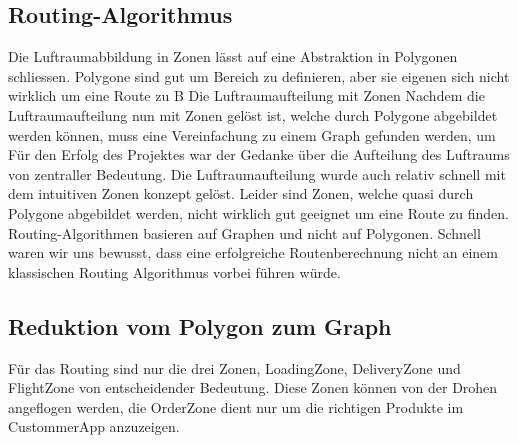 \subsection{Routing-Algorithmus}


Die Luftraumabbildung in Zonen lässt auf eine Abstraktion in Polygonen schliessen. Polygone sind gut um Bereich zu definieren, aber sie eigenen sich nicht wirklich um eine Route zu B
Die Luftraumaufteilung mit Zonen
Nachdem die Luftraumaufteilung nun mit Zonen gelöst ist, welche durch Polygone abgebildet werden können, muss eine Vereinfachung zu einem Graph gefunden werden, um
Für den Erfolg des Projektes war der Gedanke über die Aufteilung des Luftraums von zentraller Bedeutung. Die Luftraumaufteilung wurde auch relativ schnell mit dem intuitiven Zonen konzept gelöst. Leider sind Zonen, welche quasi durch Polygone abgebildet werden, nicht wirklich gut geeignet um eine Route zu finden. Routing-Algorithmen basieren auf Graphen und nicht auf Polygonen. Schnell waren wir uns bewusst, dass eine erfolgreiche Routenberechnung nicht an einem klassischen Routing Algorithmus vorbei führen würde.
\subsection{Reduktion vom Polygon zum Graph}
Für das Routing sind nur die drei Zonen, LoadingZone, DeliveryZone und FlightZone von entscheidender Bedeutung. Diese Zonen können von der Drohen angeflogen werden, die OrderZone dient nur um die richtigen Produkte im CustommerApp anzuzeigen.